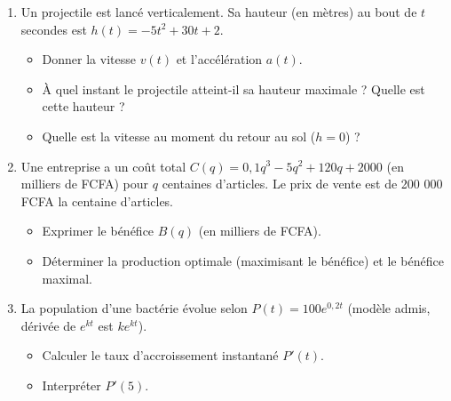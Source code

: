 \documentclass[11pt]{article}
\begin{document}
\begin{exercice}
\begin{enumerate}
\item Un projectile est lancé verticalement. Sa hauteur (en mètres) au bout de $t$ secondes est $h(t) = -5t^2 + 30t + 2$.
\begin{itemize}
\item[a)] Donner la vitesse $v(t)$ et l'accélération $a(t)$.
\item[b)] À quel instant le projectile atteint-il sa hauteur maximale ? Quelle est cette hauteur ?
\item[c)] Quelle est la vitesse au moment du retour au sol ($h=0$) ?
\end{itemize}
\item Une entreprise a un coût total $C(q) = 0,1q^3 - 5q^2 + 120q + 2000$ (en milliers de FCFA) pour $q$ centaines d'articles. Le prix de vente est de 200 000 FCFA la centaine d'articles.
\begin{itemize}
\item[a)] Exprimer le bénéfice $B(q)$ (en milliers de FCFA).
\item[b)] Déterminer la production optimale (maximisant le bénéfice) et le bénéfice maximal.
\end{itemize}
\item La population d'une bactérie évolue selon $P(t) = 100 e^{0,2t}$ (modèle admis, dérivée de $e^{kt}$ est $ke^{kt}$).
\begin{itemize}
\item[a)] Calculer le taux d'accroissement instantané $P'(t)$.
\item[b)] Interpréter $P'(5)$.
\end{itemize}
\end{enumerate}
\end{exercice}
\end{document}
